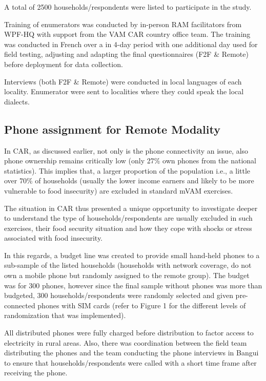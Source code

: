\documentclass[11pt,harvard]{article}
\begin{document}
A total of 2500 households/respondents were listed to participate in the study.
	
Training of enumerators was conducted by in-person RAM facilitators from WPF-HQ with support from the VAM CAR country office team. The training was conducted in French over a in 4-day period with one additional day used for field testing, adjusting and adapting the final questionnaires (F2F \& Remote) before deployment for data collection. 
	
Interviews (both F2F \& Remote) were conducted in local languages of each locality. Enumerator were sent to localities where they could speak the local dialects.
	
	
\subsection{Phone assignment for Remote Modality}
	
In CAR, as discussed earlier, not only is the phone connectivity an issue, also phone ownership remains critically low (only 27\% own phones from the national statistics). This implies that, a larger proportion of the population i.e., a little over 70\% of households (usually the lower income earners and likely to be more vulnerable to food insecurity) are excluded in standard mVAM exercises. 
	
The situation in CAR thus presented a unique opportunity to investigate deeper to understand the type of households/respondents are usually excluded in such exercises, their food security situation and how they cope with shocks or stress associated with food insecurity. 

In this regards, a budget line was created to provide small hand-held phones to a sub-sample of the listed households (households with network coverage, do not own a mobile phone but randomly assigned to the remote group). The budget was for 300 phones, however since the final sample without phones was more than budgeted, 300 households/respondents were randomly selected and given pre-connected phones with SIM cards (refer to Figure 1 for the different levels of randomization that was implemented). 
	
All distributed phones were fully charged before distribution to factor access to electricity in rural areas. Also, there was coordination between the field team distributing the phones and the team conducting the phone interviews in Bangui to ensure that households/respondents were called with a short time frame after receiving the phone.
	
\end{document}

